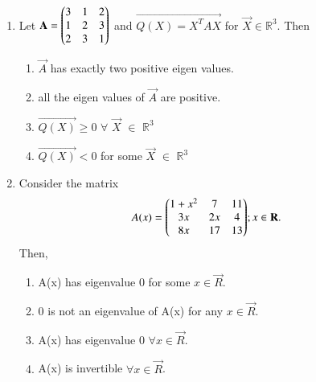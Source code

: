 \begin{enumerate}[label=\thesection.\arabic*.,ref=\thesection.\theenumi]
\begin{enumerate}
    \item {}
    \item {}
    \item {}
\end{enumerate}
%
\solution

\twocolumn
\item Let $\mathbf{A} = \begin{pmatrix}3 & 1 & 2 \\ 1 & 2 & 3 \\ 2 & 3 & 1  \end{pmatrix}$ and $\vec{Q(X) = X^TAX}$ for $\vec{X} \in \mathbb{R}^{3}$. Then
\begin{enumerate}
	\item $\vec{A}$ has exactly two positive eigen values.
	\item all the eigen values of $\vec{A}$ are positive.
	\item $\vec{Q(X)} \geq 0 $ $\forall$ $\vec{X}$ $\in$ $\mathbb{R}^3$
	\item $\vec{Q(X)} < 0 $ for some $\vec{X}$ $\in$ $\mathbb{R}^3$
\end{enumerate}
%
%
\solution

\item Consider the matrix
\begin{align}
A(x) = \begin{pmatrix}1+x^2&7&11\\3x&2x&4\\8x&17&13\end{pmatrix} & ;x\in \mathbf{R}.
\end{align}
Then,
\begin{enumerate}
\item A(x) has eigenvalue 0 for some $x\in \vec{R}$.
\item 0 is not an eigenvalue of A(x) for any $x\in \vec{R}$.
\item A(x) has eigenvalue 0 $\forall x\in \vec{R}$.
\item A(x) is invertible $\forall x\in \vec{R}$.
\end{enumerate}
%
\solution

\end{enumerate}
